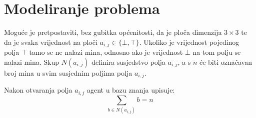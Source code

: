 \documentclass{article}
\begin{document}
\section{Modeliranje problema}

Moguće je pretpostaviti, bez gubitka općenitosti, da je ploča dimenzija $3 \times 3$ te da je
svaka vrijednost na ploči $a_{i, j} \in \{\bot, \top\}$. Ukoliko je vrijednost pojedinog polja
$\top$ tamo se ne nalazi mina, odnosno ako je vrijednost $\bot$ na tom polju se nalazi mina.
Skup $N(a_{i, j})$ definira susjedstvo polja $a_{i, j}$, a s $n$ će biti označavan broj mina
u svim susjednim poljima polja $a_{i, j}$.

Nakon otvaranja polja $a_{i, j}$ agent u bazu znanja upisuje:
\begin{equation}
    \sum_{b \in N(a_{i, j})} b = n
\end{equation}
\end{document}
